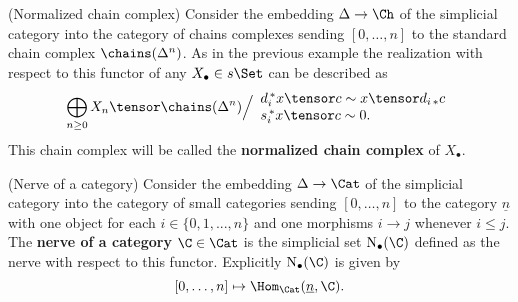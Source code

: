 \documentclass[main.tex]{subfiles}
\begin{document}
\begin{aex}(Normalized chain complex) \label{normalized chain complex}
Consider the embedding $\Delta\to\Ch$ of the simplicial category into the category of chains complexes sending $[0,\dotsc,n]$ to the standard chain complex $\chains(\Delta^n)$. As in the previous example the realization with respect to this functor of any $X_\bullet\in s\Set$ can be described as
$$\bigoplus_{n\geq0}X_n\tensor\chains(\Delta^n)\Big/\begin{array}{l} d_i^{\,*}x\tensor c\sim x\tensor d_{i\,*}c\\ s_i^{\,*}x\tensor c\sim 0.\end{array}$$
This chain complex will be called the \textbf{normalized chain complex} of $X_\bullet$.
\end{aex}

\begin{aex}(Nerve of a category)\label{nerve of a category}
Consider the embedding $\Delta\to\Cat$ of the simplicial category into the category of small categories sending $[0,\dotsc,n]$ to the category $\underline n$ with one object for each $i\in\{0,1,...,n\}$ and one morphisms $i\to j$ whenever $i\leq j$. The \textbf{nerve of a category} $\C\in\Cat$ is the simplicial set $\mathrm N_\bullet(\C)$ defined as the nerve with respect to this functor. Explicitly $\mathrm N_\bullet(\C)$ is given by $$[0,\dotsc,n]\mapsto\Hom_{\Cat}(\underline n,\C).$$
\end{aex}
\end{document}
